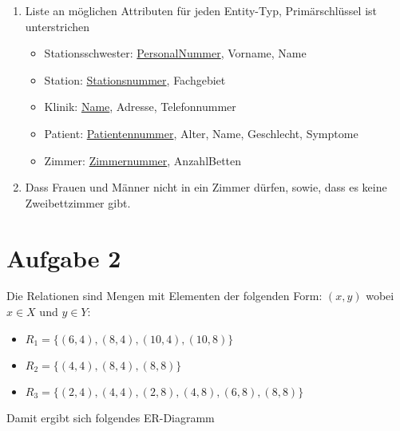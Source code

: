 \documentclass{article}
\begin{document}
\begin{enumerate}[label=(\alph*)]
\begin{center}
		\end{center}
		\item Liste an möglichen Attributen für jeden Entity-Typ, Primärschlüssel ist unterstrichen
		\begin{itemize}
			\item Stationsschwester: \underline{PersonalNummer}, Vorname, Name
			\item Station: \underline{Stationsnummer}, Fachgebiet
			\item Klinik: \underline{Name}, Adresse, Telefonnummer
			\item Patient: \underline{Patientennummer}, Alter, Name, Geschlecht, Symptome
			\item Zimmer: \underline{Zimmernummer}, AnzahlBetten
		\end{itemize}
		\item Dass Frauen und Männer nicht in ein Zimmer dürfen, sowie, dass es keine Zweibettzimmer gibt.
	\end{enumerate}

	\section*{Aufgabe 2}
	Die Relationen sind Mengen mit Elementen der folgenden Form: $(x,y)$ wobei $x\in X$ und $y\in Y$:
	\begin{itemize}
		\item $R_1=\{(6,4),(8,4),(10,4),(10,8)\}$
		\item $R_2=\{(4,4),(8,4),(8,8)\}$
		\item $R_3=\{(2,4),(4,4),(2,8),(4,8),(6,8),(8,8)\}$
	\end{itemize}
	Damit ergibt sich folgendes ER-Diagramm
	\begin{center}
	\end{center}
\end{document}

